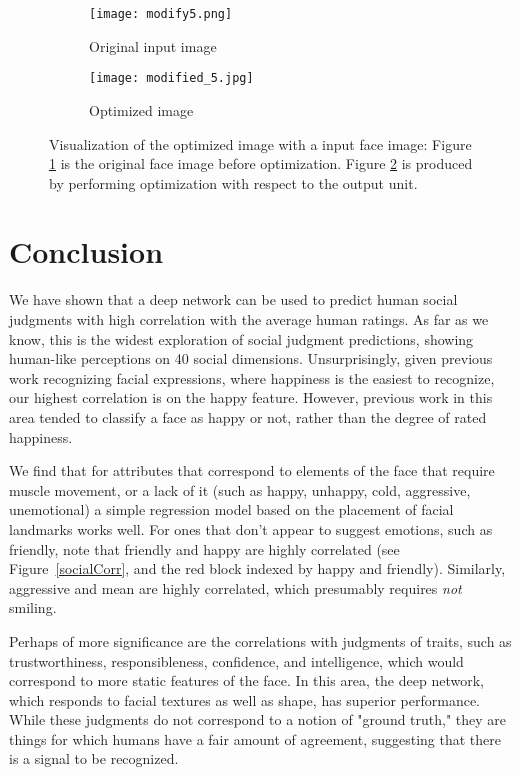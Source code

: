 \documentclass[10pt,twocolumn,letterpaper]{article}
\begin{document}
\begin{figure}[!htbp]
\centering
\begin{subfigure}{.25\textwidth}
  \centering
  \texttt{[image: modify5.png]}
  \caption{Original input image}
   \label{original}
\end{subfigure}%
\begin{subfigure}{.25\textwidth}
  \centering
  \texttt{[image: modified\_5.jpg]} 
   \caption{Optimized image}
  \label{optimize}
\end{subfigure}
\caption{Visualization of the optimized image with a input face image: Figure \ref{original} is the original face image before optimization. Figure \ref{optimize} is produced by performing optimization with respect to the output unit.}
\label{faceOptimize}
\end{figure}

\section{Conclusion} \label{conclude}
We have shown that a deep network can be used to predict human social judgments with high correlation with the average human ratings. As far as we know, this is the widest exploration of social judgment predictions, showing human-like perceptions on 40 social dimensions. Unsurprisingly, given previous work recognizing facial expressions, where happiness is the easiest to recognize, our highest correlation is on the happy feature. However, previous work in this area tended to classify a face as happy or not, rather than the degree of rated happiness.

We find that for attributes that correspond to elements of the face that require muscle movement, or a lack of it (such as happy, unhappy, cold, aggressive, unemotional) a simple regression model based on the placement of facial landmarks works well. For ones that don't appear to suggest emotions, such as friendly, note that friendly and happy are highly correlated (see Figure~\ref{socialCorr}, and the red block indexed by happy and friendly). Similarly, aggressive and mean are highly correlated, which presumably requires \emph{not} smiling. 

Perhaps of more significance are the correlations with judgments of traits, such as trustworthiness, responsibleness, confidence, and intelligence,  which would correspond to  more static features of the face. In this area, the deep network, which responds to facial textures  as well as shape, has superior performance. While these judgments do not correspond to a notion of "ground truth," they are things for which humans have a fair amount of agreement, suggesting that there is a signal to be recognized.
\end{document}
